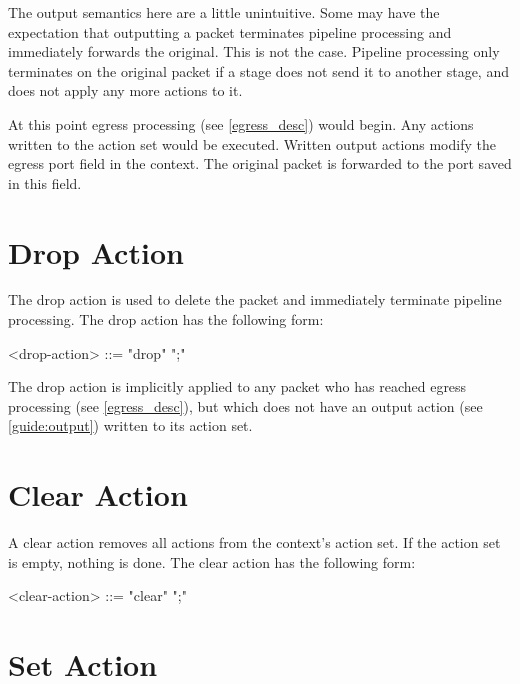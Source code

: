 The output semantics here are a little unintuitive. Some may have the expectation that outputting a packet terminates pipeline processing and immediately forwards the original. This is not the case. Pipeline processing only terminates on the original packet if a stage does not send it to another stage, and does not apply any more actions to it. 

At this point egress processing (see \ref{egress_desc}) would begin. Any actions written to the action set would be executed. Written output actions modify the egress port field in the context. The original packet is forwarded to the port saved in this field.

\section{Drop Action} \label{guide:drop}

The drop action is used to delete the packet and immediately terminate pipeline processing. The drop action has the following form:

\begin{minip}
\begin{grammar}
<drop-action> ::= "drop" ";"
\end{grammar}
\end{minip}

The drop action is implicitly applied to any packet who has reached egress processing (see \ref{egress_desc}), but which does not have an output action (see \ref{guide:output}) written to its action set.

\section{Clear Action} \label{guide:clear}

A clear action removes all actions from the context's action set. If the action set is empty, nothing is done. The clear action has the following form:

\begin{minip}
\begin{grammar}
<clear-action> ::= "clear" ";"
\end{grammar}
\end{minip}

\section{Set Action} \label{guide:set_field}

